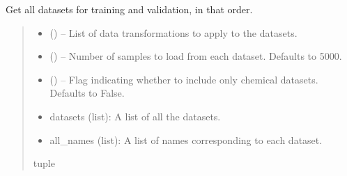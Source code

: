 \documentclass[letterpaper,10pt,english]{sphinxhowto}
\begin{document}
\begin{fulllineitems}
\label{\detokenize{datasets/loaders:datasets.loaders.get_all_datasets}}
\pysigstartsignatures
{}
\pysigstopsignatures
\sphinxAtStartPar
Get all datasets for training and validation, in that order.
\begin{quote}\begin{description}
\begin{itemize}
\item {} 
\sphinxAtStartPar
{} () – List of data transformations to apply to the datasets.

\item {} 
\sphinxAtStartPar
{} (\sphinxstyleliteralemphasis{\sphinxupquote{, }}) – Number of samples to load from each dataset. Defaults to 5000.

\item {} 
\sphinxAtStartPar
{} (\sphinxstyleliteralemphasis{\sphinxupquote{, }}) – Flag indicating whether to include only chemical datasets. Defaults to False.

\end{itemize}

\sphinxAtStartPar
\begin{description}
\begin{itemize}
\item {} 
\sphinxAtStartPar
datasets (list): A list of all the datasets.

\item {} 
\sphinxAtStartPar
all\_names (list): A list of names corresponding to each dataset.

\end{itemize}

\end{description}


\sphinxAtStartPar
tuple

\end{description}\end{quote}

\end{fulllineitems}
\end{document}
